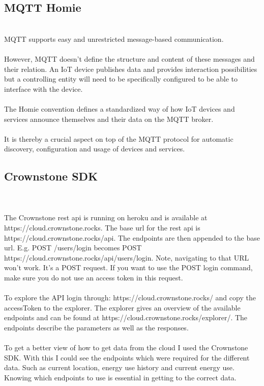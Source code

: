 \documentclass{article}
\begin{document}
\cleardoublepage
\subsection{MQTT Homie}\label{sec:homie}
\\
MQTT supports easy and unrestricted message-based communication.\\
\\
However, MQTT doesn't define the structure and content of these messages and their relation. An IoT device publishes data and provides interaction possibilities but a controlling entity will need to be specifically configured to be able to interface with the device.\\
\\
The Homie convention defines a standardized way of how IoT devices and services announce themselves and their data on the MQTT broker.\\
\\
It is thereby a crucial aspect on top of the MQTT protocol for automatic discovery, configuration and usage of devices and services.
\\
\subsection{Crownstone SDK}\label{sec:CSDK}\\
\\
The Crownstone rest api is running on heroku and is available at https://cloud.crownstone.rocks. The base url for the rest api is https://cloud.crownstone.rocks/api. The endpoints are then appended to the base url. E.g. POST /users/login becomes POST https://cloud.crownstone.rocks/api/users/login. Note, navigating to that URL won't work. It's a POST request. If you want to use the POST login command, make sure you do not use an access token in this request.\\
\\
To explore the API login through: https://cloud.crownstone.rocks/ and copy the accessToken to the explorer. The explorer gives an overview of the available endpoints and can be found at https://cloud.crownstone.rocks/explorer/. The endpoints describe the parameters as well as the responses.\\
\\
To get a better view of how to get data from the cloud I used the Crownstone SDK. With this I could see the endpoints which were required for the different data. Such as current location, energy use history and current energy use. Knowing which endpoints to use  is essential in getting to the correct data.\\ 
\end{document}
